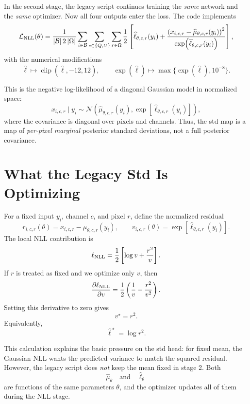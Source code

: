 \documentclass[11pt]{article}
\newcommand{\mean}{\mu}
\newcommand{\logvar}{\ell}
\newcommand{\pix}{r}
\newcommand{\chan}{c}
\newcommand{\grid}{\Omega}
\newcommand{\batch}{\mathcal{B}}
\begin{document}
In the second stage, the legacy script continues training the \emph{same}
network and the \emph{same} optimizer.  Now all four outputs enter the loss.
The code implements
\[
  \mathcal{L}_{\rm NLL}(\theta)
  =
  \frac{1}{|\batch|\,2\,|\grid|}
  \sum_{i\in\batch}
  \sum_{\chan\in\{Q,U\}}
  \sum_{\pix\in\grid}
  \frac{1}{2}
  \left[
    \widehat{\logvar}_{\theta,\chan,\pix}(y_i)
    +
    \frac{
      \left(
        x_{i,\chan,\pix}
        -
        \widehat{\mean}_{\theta,\chan,\pix}(y_i)
      \right)^2
    }{
      \exp\!\left(
        \widehat{\logvar}_{\theta,\chan,\pix}(y_i)
      \right)
    }
  \right],
\]
with the numerical modifications
\[
  \widehat{\logvar}
  \mapsto
  \operatorname{clip}(\widehat{\logvar},-12,12),
  \qquad
  \exp(\widehat{\logvar})
  \mapsto
  \max\{\exp(\widehat{\logvar}),10^{-8}\}.
\]

This is the negative log-likelihood of a diagonal Gaussian model in normalized
space:
\[
  x_{i,\chan,\pix}\mid y_i
  \sim
  \mathcal{N}
  \left(
    \widehat{\mean}_{\theta,\chan,\pix}(y_i),
    \exp\!\left[\widehat{\logvar}_{\theta,\chan,\pix}(y_i)\right]
  \right),
\]
where the covariance is diagonal over pixels and channels.  Thus, the std map
is a map of \emph{per-pixel marginal} posterior standard deviations, not a full
posterior covariance.

\section{What the Legacy Std Is Optimizing}

For a fixed input \(y_i\), channel \(\chan\), and pixel \(\pix\), define the
normalized residual
\[
  r_{i,\chan,\pix}(\theta)
  =
  x_{i,\chan,\pix}
  -
  \widehat{\mean}_{\theta,\chan,\pix}(y_i),
  \qquad
  v_{i,\chan,\pix}(\theta)
  =
  \exp\!\left[
    \widehat{\logvar}_{\theta,\chan,\pix}(y_i)
  \right].
\]
The local NLL contribution is
\[
  \ell_{\rm NLL}
  =
  \frac{1}{2}
  \left[
    \log v
    +
    \frac{r^2}{v}
  \right].
\]
If \(r\) is treated as fixed and we optimize only \(v\), then
\[
  \frac{\partial \ell_{\rm NLL}}{\partial v}
  =
  \frac{1}{2}
  \left(
    \frac{1}{v}
    -
    \frac{r^2}{v^2}
  \right).
\]
Setting this derivative to zero gives
\[
  v^\star = r^2.
\]
Equivalently,
\[
  \widehat{\logvar}^{\,\star}
  =
  \log r^2.
\]

This calculation explains the basic pressure on the std head: for fixed mean,
the Gaussian NLL wants the predicted variance to match the squared residual.
However, the legacy script does \emph{not} keep the mean fixed in stage 2.
Both
\[
  \widehat{\mean}_{\theta}
  \quad\text{and}\quad
  \widehat{\logvar}_{\theta}
\]
are functions of the same parameters \(\theta\), and the optimizer updates all
of them during the NLL stage.
\end{document}
